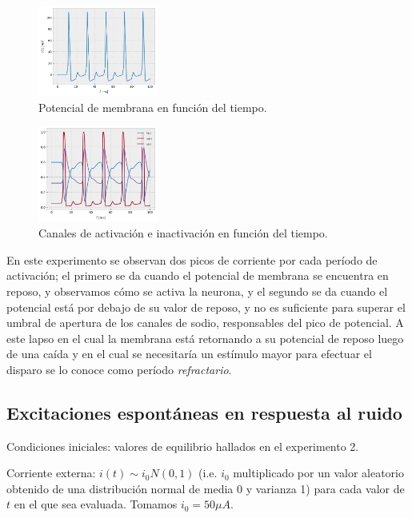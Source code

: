 \documentclass[aps,twocolumn,groupedaddress]{revtex4-2}
\begin{document}
\begin{figure}[ht]
    \centering
    \includegraphics[width=0.35\textwidth]{figs/ej6_potencial.png}
    \caption{Potencial de membrana en función del tiempo.} 
    \label{fig:ej6_potencial}
\end{figure}
\begin{figure}[ht]
    \centering
    \includegraphics[width=0.35\textwidth]{figs/ej6_canales.png}
    \caption{Canales de activación e inactivación en función del tiempo.} 
    \label{fig:ej6_canales}
\end{figure}

En este experimento se observan dos picos de corriente por cada período de activación; el primero se da cuando el potencial de membrana se encuentra en reposo, y observamos cómo se activa la neurona, y el segundo se da cuando el potencial está por debajo de su valor de reposo, y no es suficiente para superar el umbral de apertura de los canales de sodio, responsables del pico de potencial. A este lapso en el cual la membrana está retornando a su potencial de reposo luego de una caída y en el cual se necesitaría un estímulo mayor para efectuar el disparo se lo conoce como período \textit{refractario}.

\subsection{Excitaciones espontáneas en respuesta al ruido}
Condiciones iniciales: valores de equilibrio hallados en el experimento 2.

Corriente externa: $i(t)\sim i_0 N(0,1)$ (i.e. $i_0$ multiplicado por un valor aleatorio obtenido de una distribución normal de media 0 y varianza 1) para cada valor de $t$ en el que sea evaluada. Tomamos $i_0=50\mu A$.
\end{document}
